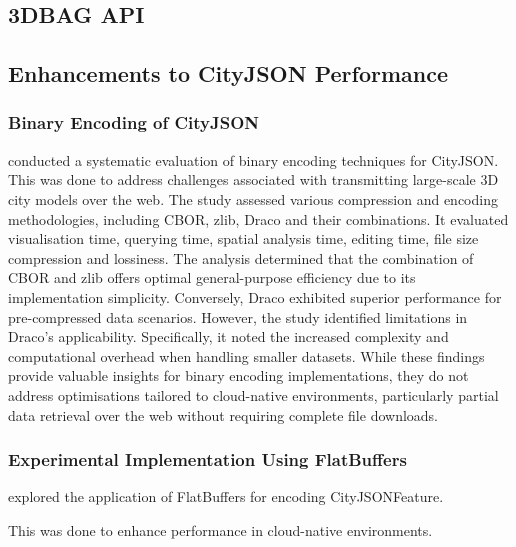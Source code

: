 \subsection{3DBAG API}
\label{rw:cityjson_enhancements:3dbag_api}

\subsection{Enhancements to CityJSON Performance}
\label{rw:cityjson_enhancements:performance}

\subsubsection{Binary Encoding of CityJSON}
\label{rw:cityjson_enhancements:performance:binary_encoding}

\citet{jordi_van_liempt_2020} conducted a systematic evaluation of binary encoding techniques for CityJSON.
This was done to address challenges associated with transmitting large-scale 3D city models over the web.
The study assessed various compression and encoding methodologies, including CBOR, zlib, Draco and their combinations.
It evaluated visualisation time, querying time, spatial analysis time, editing time, file size compression and lossiness.
The analysis determined that the combination of CBOR and zlib offers optimal general-purpose efficiency due to its implementation simplicity.
Conversely, Draco exhibited superior performance for pre-compressed data scenarios.
However, the study identified limitations in Draco's applicability.
Specifically, it noted the increased complexity and computational overhead when handling smaller datasets.
While these findings provide valuable insights for binary encoding implementations, they do not address optimisations tailored to cloud-native environments, particularly partial data retrieval over the web without requiring complete file downloads.

\subsubsection{Experimental Implementation Using FlatBuffers}
\label{rw:cityjson_enhancements:performance:flatbuffers}

\citet{ravi_peters_2024_citybuf} explored the application of FlatBuffers \citep{flatbuffers} for encoding CityJSONFeature.

This was done to enhance performance in cloud-native environments.

